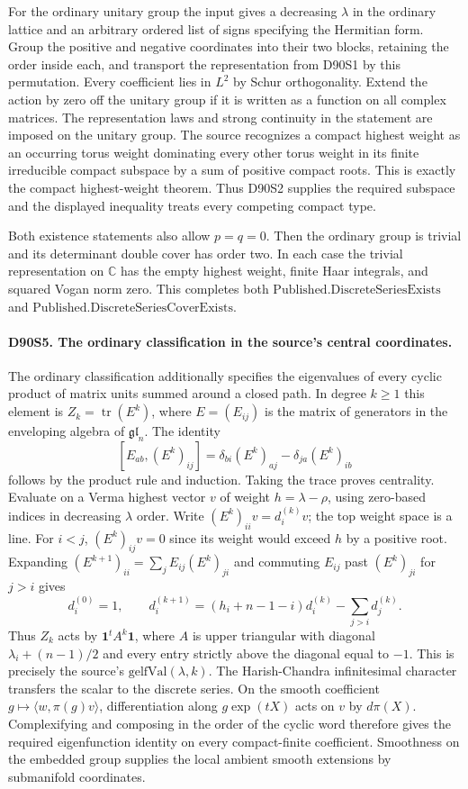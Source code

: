 For the ordinary unitary group the input gives a decreasing
$\lambda$ in the ordinary lattice and an arbitrary ordered list
of signs specifying the Hermitian form. Group the positive and
negative coordinates into their two blocks, retaining the order
inside each, and transport the representation from D90S1 by this
permutation. Every coefficient lies in $L^2$ by Schur orthogonality.
Extend the action by zero off the unitary group if it is written as a
function on all complex matrices. The representation laws and
strong continuity in the statement are imposed on the unitary group.
The source recognizes a compact highest weight as an occurring
torus weight dominating every other torus weight in its finite
irreducible compact subspace by a sum of positive compact roots.
This is exactly the compact highest-weight theorem. Thus D90S2
supplies the required subspace and the displayed inequality treats
every competing compact type.

Both existence statements also allow $p=q=0$. Then the ordinary
group is trivial and its determinant double cover has order two.
In each case the trivial representation on $\mathbb C$ has the
empty highest weight, finite Haar integrals, and squared Vogan
norm zero. This completes both
$\mathrm{Published.DiscreteSeriesExists}$ and
$\mathrm{Published.DiscreteSeriesCoverExists}$.

\paragraph{D90S5. The ordinary classification in the source's central coordinates.}
The ordinary classification additionally specifies the eigenvalues
of every cyclic product of matrix units summed around a closed
path. In degree $k\ge1$ this element is
$Z_k=\operatorname{tr}(E^k)$, where $E=(E_{ij})$ is the matrix
of generators in the enveloping algebra of $\mathfrak{gl}_n$.
The identity
\[
 [E_{ab},(E^k)_{ij}]
 =\delta_{bi}(E^k)_{aj}-\delta_{ja}(E^k)_{ib}
\]
follows by the product rule and induction. Taking the trace proves
centrality. Evaluate on a Verma highest vector $v$ of weight
$h=\lambda-\rho$, using zero-based indices in decreasing
$\lambda$ order. Write $(E^k)_{ii}v=d_i^{(k)}v$; the top weight
space is a line. For $i<j$, $(E^k)_{ij}v=0$ since its weight
would exceed $h$ by a positive root. Expanding
$(E^{k+1})_{ii}=\sum_j E_{ij}(E^k)_{ji}$ and commuting
$E_{ij}$ past $(E^k)_{ji}$ for $j>i$ gives
\[
 d_i^{(0)}=1,\qquad
 d_i^{(k+1)}=(h_i+n-1-i)d_i^{(k)}-\sum_{j>i}d_j^{(k)}.
\]
Thus $Z_k$ acts by $\mathbf1^t A^k\mathbf1$, where $A$ is upper
triangular with diagonal $\lambda_i+(n-1)/2$ and every entry
strictly above the diagonal equal to $-1$. This is precisely the
source's $\mathrm{gelfVal}(\lambda,k)$. The Harish-Chandra
infinitesimal character transfers the scalar to the discrete
series. On the smooth coefficient $g\mapsto\langle w,\pi(g)v\rangle$,
differentiation along $g\exp(tX)$ acts on $v$ by $d\pi(X)$.
Complexifying and composing in the order of the cyclic word therefore
gives the required eigenfunction identity on every compact-finite
coefficient. Smoothness on the embedded group supplies the local
ambient smooth extensions by submanifold coordinates.

